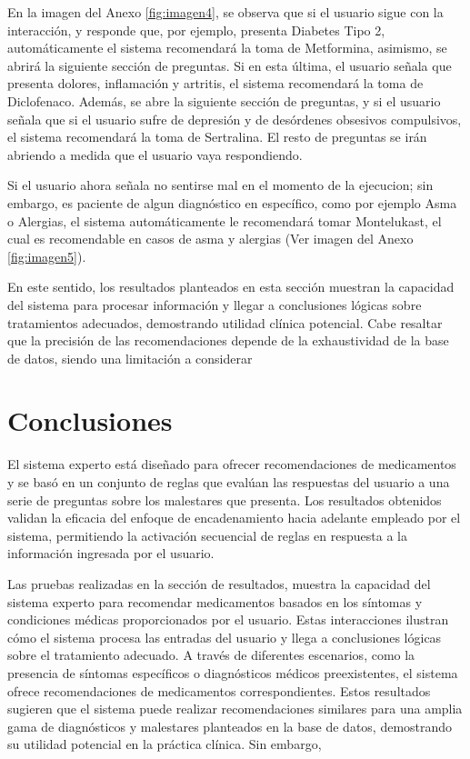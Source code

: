 \documentclass[11pt]{article}
\begin{document}
\begin{multicols}{2}
En la imagen del Anexo \ref{fig:imagen4}, se observa que si el usuario sigue con la interacción, y responde que, por ejemplo, presenta Diabetes Tipo 2, automáticamente el sistema recomendará la toma de Metformina, asimismo, se abrirá la siguiente sección de preguntas. Si en esta última, el usuario señala que presenta dolores, inflamación y artritis, el sistema recomendará la toma de Diclofenaco. Además, se abre la siguiente sección de preguntas, y si el usuario señala que si el usuario sufre de depresión y de desórdenes obsesivos compulsivos, el sistema recomendará la toma de Sertralina. El resto de preguntas se irán abriendo a medida que el usuario vaya respondiendo. 

Si el usuario ahora señala no sentirse mal en el momento de la ejecucion; sin embargo, es paciente de algun diagnóstico en específico, como por ejemplo Asma o Alergias, el sistema automáticamente le recomendará tomar Montelukast, el cual es recomendable en casos de asma y alergias (Ver imagen del Anexo \ref{fig:imagen5}).

En este sentido, los resultados planteados en esta sección muestran la capacidad del sistema para procesar información y llegar a conclusiones lógicas sobre tratamientos adecuados, demostrando utilidad clínica potencial. Cabe resaltar que la precisión de las recomendaciones depende de la exhaustividad de la base de datos, siendo una limitación a considerar

\section{Conclusiones}

El sistema experto está diseñado para ofrecer recomendaciones de medicamentos y se basó en un conjunto de reglas que evalúan las respuestas del usuario a una serie de preguntas sobre los malestares que presenta. Los resultados obtenidos validan la eficacia del enfoque de encadenamiento hacia adelante empleado por el sistema, permitiendo la activación secuencial de reglas en respuesta a la información ingresada por el usuario. 

Las pruebas realizadas en la sección de resultados, muestra la capacidad del sistema experto para recomendar medicamentos basados en los síntomas y condiciones médicas proporcionados por el usuario. Estas interacciones ilustran cómo el sistema procesa las entradas del usuario y llega a conclusiones lógicas sobre el tratamiento adecuado. A través de diferentes escenarios, como la presencia de síntomas específicos o diagnósticos médicos preexistentes, el sistema ofrece recomendaciones de medicamentos correspondientes. Estos resultados sugieren que el sistema puede realizar recomendaciones similares para una amplia gama de diagnósticos y malestares planteados en la base de datos, demostrando su utilidad potencial en la práctica clínica. Sin embargo, 


\end{multicols}
\end{document}
